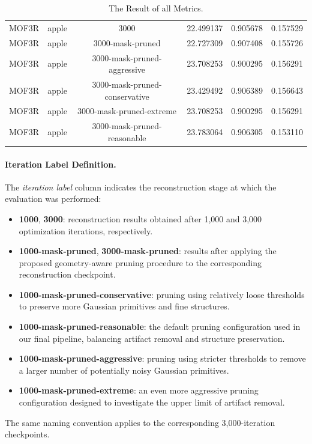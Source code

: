 \begin{table}[h!]
\begin{tabular}{c|c|c|c|c|c}
MOF3R & apple & 3000 & 22.499137 & 0.905678 & 0.157529 \\
MOF3R & apple & 3000-mask-pruned & 22.727309 & 0.907408 & 0.155726 \\
MOF3R & apple & 3000-mask-pruned-aggressive & 23.708253 & 0.900295 & 0.156291 \\
MOF3R & apple & 3000-mask-pruned-conservative & 23.429492 & 0.906389 & 0.156643 \\
MOF3R & apple & 3000-mask-pruned-extreme & 23.708253 & 0.900295 & 0.156291 \\
MOF3R & apple & 3000-mask-pruned-reasonable & 23.783064 & 0.906305 & 0.153110 \\ \bottomrule
    \end{tabular}
    \caption{The Result of all Metrics.}
    \label{tab:all_result}
\end{table}

\paragraph{Iteration Label Definition.}
The \textit{iteration label} column indicates the reconstruction
stage at which the evaluation was performed:

\begin{itemize}
    \item \textbf{1000}, \textbf{3000}: reconstruction results obtained after 1,000 and 3,000 optimization iterations, respectively.
    
    \item \textbf{1000-mask-pruned}, \textbf{3000-mask-pruned}: results after applying the proposed geometry-aware pruning procedure to the corresponding reconstruction checkpoint.
    
    \item \textbf{1000-mask-pruned-conservative}: pruning using relatively loose thresholds to preserve more Gaussian primitives and fine structures.
    
    \item \textbf{1000-mask-pruned-reasonable}: the default pruning configuration used in our final pipeline, balancing artifact removal and structure preservation.
    
    \item \textbf{1000-mask-pruned-aggressive}: pruning using stricter thresholds to remove a larger number of potentially noisy Gaussian primitives.
    
    \item \textbf{1000-mask-pruned-extreme}: an even more aggressive pruning configuration designed to investigate the upper limit of artifact removal.
\end{itemize}

The same naming convention applies to the corresponding
3,000-iteration checkpoints.